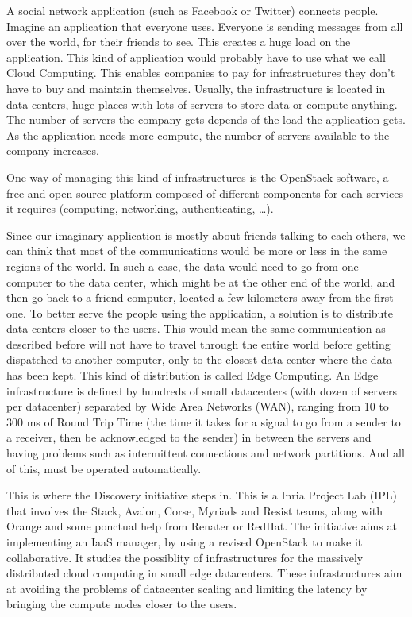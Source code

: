 A social network application (such as Facebook or Twitter) connects people. Imagine an application that everyone uses. Everyone is sending messages from all over the world, for their friends to see. This creates a huge load on the application. This kind of application would probably have to use what we call Cloud Computing. This enables companies to pay for infrastructures they don't have to buy and maintain themselves. Usually, the infrastructure is located in data centers, huge places with lots of servers to store data or compute anything. The number of servers the company gets depends of the load the application gets. As the application needs more compute, the number of servers available to the company increases.

One way of managing this kind of infrastructures is the OpenStack software, a free and open-source platform composed of different components for each services it requires (computing, networking, authenticating, \ldots).

Since our imaginary application is mostly about friends talking to each others, we can think that most of the communications would be more or less in the same regions of the world. In such a case, the data would need to go from one computer to the data center, which might be at the other end of the world, and then go back to a friend computer, located a few kilometers away from the first one. To better serve the people using the application, a solution is to distribute data centers closer to the users. This would mean the same communication as described before will not have to travel through the entire world before getting dispatched to another computer, only to the closest data center where the data has been kept. This kind of distribution is called Edge Computing. An Edge infrastructure is defined by hundreds of small datacenters (with dozen of servers per datacenter) separated by Wide Area Networks (WAN), ranging from 10 to 300 ms of Round Trip Time (the time it takes for a signal to go from a sender to a receiver, then be acknowledged to the sender) in between the servers and having problems such as intermittent connections and network partitions. And all of this, must be operated automatically.


This is where the Discovery initiative\cite{discovery} steps in. This is a Inria Project Lab (IPL) that involves the Stack, Avalon, Corse, Myriads and Resist teams, along with Orange and some ponctual help from Renater or RedHat. The initiative aims at implementing an IaaS manager, by using a revised OpenStack to make it collaborative. It studies the possiblity of infrastructures for the massively distributed cloud computing in small edge datacenters. These infrastructures aim at avoiding the problems of datacenter scaling and limiting the latency by bringing the compute nodes closer to the users.

